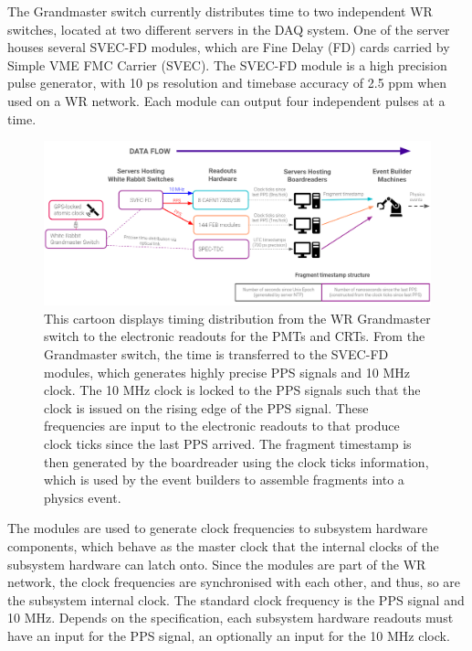 The Grandmaster switch currently distributes time to two independent WR switches, located at two different servers in the DAQ system.
One of the server houses several SVEC-FD modules, which are Fine Delay (FD) cards carried by Simple VME FMC Carrier (SVEC).
The SVEC-FD module is a high precision pulse generator, with 10 ps resolution and timebase accuracy of 2.5 ppm when used on a WR network.
Each module can output four independent pulses at a time.

\begin{figure}[htbp!] 
\centering    
\includegraphics[width=1.0\textwidth]{time_transfer}
\caption[timeTransfer]{
This cartoon displays timing distribution from the WR Grandmaster switch to the electronic readouts for the PMTs and CRTs.
From the Grandmaster switch, the time is transferred to the SVEC-FD modules, which generates highly precise PPS signals and 10 MHz clock.
The 10 MHz clock is locked to the PPS signals such that the clock is issued on the rising edge of the PPS signal.
These frequencies are input to the electronic readouts to that produce clock ticks since the last PPS arrived.
The fragment timestamp is then generated by the boardreader using the clock ticks information, which is used by the event builders to assemble fragments into a physics event.
}
\label{fig:timeTransfer}
\end{figure}

The modules are used to generate clock frequencies to subsystem hardware components, which behave as the master clock that the internal clocks of the subsystem hardware can latch onto.
Since the modules are part of the WR network, the clock frequencies are synchronised with each other, and thus, so are the subsystem internal clock.
The standard clock frequency is the PPS signal and 10 MHz. 
Depends on the specification, each subsystem hardware readouts must have an input for the PPS signal, an optionally an input for the 10 MHz clock.

